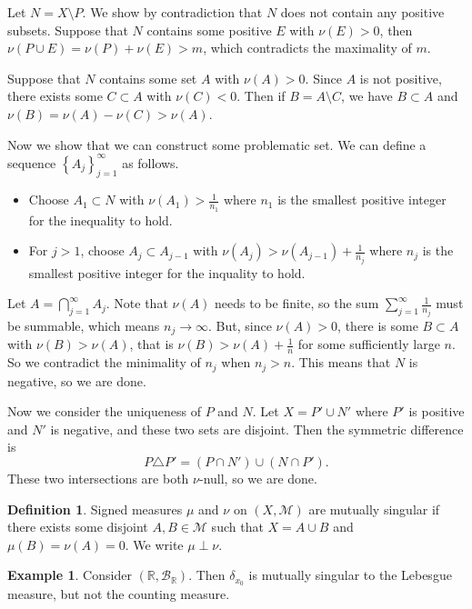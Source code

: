 \documentclass[11pt]{article}
\theoremstyle{definition}
\newtheorem{defn}{Definition}[section]
\newtheorem{example}{Example}[section]
\newcommand{\sm}[0]{\setminus}
\newcommand{\set}[1]{\left\{ #1 \right\}}
\newcommand{\RR}{\mathbb{R}}
\newcommand{\m}[1]{\mathcal{#1}}
\begin{document}
Let $N=X\sm P$. We show by contradiction that $N$ does not contain any positive subsets.
Suppose that $N$ contains some positive $E$ with $\nu(E)>0$, then $\nu(P\cup E) =
\nu(P)+\nu(E) > m$, which contradicts the maximality of $m$.

Suppose that $N$ contains some set $A$ with $\nu(A)>0$. Since $A$ is not positive,
there exists some $C\subset A$ with $\nu(C)<0$. Then if $B=A\sm C$, we have $B\subset A$
and $\nu(B)=\nu(A)-\nu(C)>\nu(A)$.

Now we show that we can construct some problematic set.  We can define a sequence
$\set{A_j}_{j=1}^\infty$ as follows.
\begin{itemize}
  \item Choose $A_1\subset N$ with $\nu(A_1)>\frac1{n_1}$ where $n_1$ is the smallest
  positive integer for the inequality to hold.
  \item For $j>1$, choose $A_j\subset A_{j-1}$ with $\nu(A_j)>\nu(A_{j-1})+\frac1{n_j}$
  where $n_j$ is the smallest positive integer for the inquality to hold.
\end{itemize}
Let $A=\bigcap_{j=1}^\infty A_j$. Note that $\nu(A)$ needs to be finite, so the sum
$\sum_{j=1}^\infty\frac1{n_j}$ must be summable, which means $n_j\to\infty$.  But, since
$\nu(A)>0$, there is some $B\subset A$ with $\nu(B)>\nu(A)$, that is
$\nu(B)>\nu(A)+\frac1n$ for some sufficiently large $n$. So we contradict the minimality
of $n_j$ when $n_j>n$. This means that $N$ is negative, so we are done. 

Now we consider the uniqueness of $P$ and $N$. Let $X=P'\cup N'$ where $P'$ is positive
and $N'$ is negative, and these two sets are disjoint. Then the symmetric difference is 
\[
  P\triangle P' = (P\cap N') \cup (N\cap P') .
\]
These two intersections are both $\nu$-null, so we are done. 
\qedhere


\begin{defn}
  Signed measures $\mu$ and $\nu$ on $(X,\m{M})$ are mutually singular if there exists
  some disjoint $A,B\in\m{M}$ such that $X=A\cup B$ and $\mu(B)=\nu(A)=0$.  We write
  $\mu\perp\nu$. 
\end{defn}

\begin{example}
  Consider $(\RR,\m{B}_\RR)$. Then $\delta_{x_0}$ is mutually singular to the Lebesgue
  measure, but not the counting measure. 
\end{example}
\end{document}

